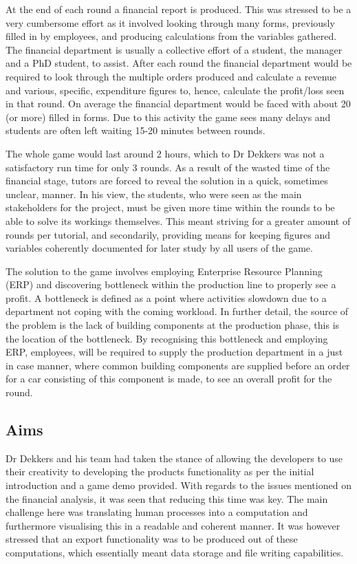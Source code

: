 \documentclass{l3proj}
\begin{document}
At the end of each round a financial report is produced. This was stressed to be a very cumbersome effort as it involved looking through many forms, previously filled in by employees, and producing calculations from the variables gathered. The financial department is usually a collective effort of a student, the manager and a PhD student, to assist. After each round the financial department would be required to look through the multiple orders produced and calculate a revenue and various, specific, expenditure figures to, hence, calculate the profit/loss seen in that round. On average the financial department would be faced with about 20 (or more) filled in forms. Due to this activity the game sees many delays and students are often left waiting 15-20 minutes between rounds.

The whole game would last around 2 hours, which to Dr Dekkers was not a satisfactory run time for only 3 rounds. As a result of the wasted time of the financial stage, tutors are forced to reveal the solution in a quick, sometimes unclear, manner. In his view, the students, who were seen as the main stakeholders for the project, must be given more time within the rounds to be able to solve its workings themselves. This meant striving for a greater amount of rounds per tutorial, and secondarily, providing means for keeping figures and variables coherently documented for later study by all users of the game.

The solution to the game involves employing Enterprise Resource Planning (ERP) and discovering bottleneck within the production line to properly see a profit. A bottleneck is defined as a point where activities slowdown due to a department not coping with the coming workload. In further detail, the source of the problem is the lack of building components at the production phase, this is the location of the bottleneck. By recognising this bottleneck and employing ERP, employees, will be required to supply the production department in a just in case manner, where common building components are supplied before an order for a car consisting of this component is made, to see an overall profit for the round.

\subsection{Aims}
Dr Dekkers and his team had taken the stance of allowing the developers to use their creativity to developing the products functionality as per the initial introduction and a game demo provided. With regards to the issues mentioned on the financial analysis, it was seen that reducing this time was key. The main challenge here was translating human processes into a computation and furthermore visualising this in a readable and coherent manner. It was however stressed that an export functionality was to be produced out of these computations, which essentially meant data storage and file writing capabilities.
    
\end{document}
